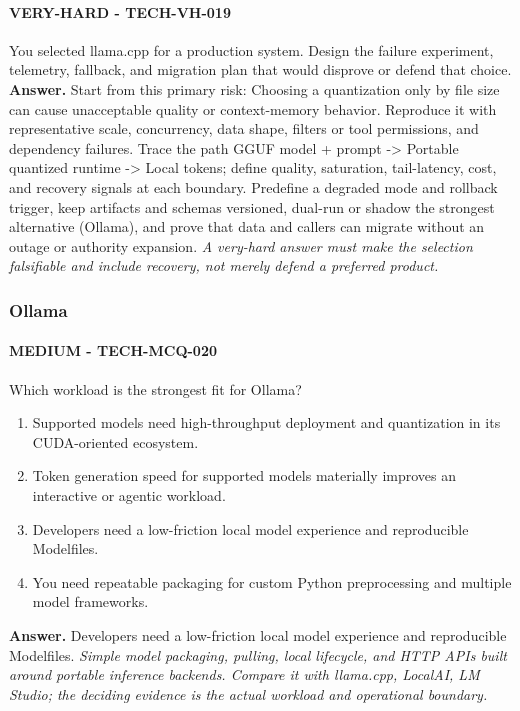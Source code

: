 \paragraph{VERY-HARD - TECH-VH-019} You selected llama.cpp for a production system. Design the failure experiment, telemetry, fallback, and migration plan that would disprove or defend that choice.
\textbf{Answer.} Start from this primary risk: Choosing a quantization only by file size can cause unacceptable quality or context-memory behavior. Reproduce it with representative scale, concurrency, data shape, filters or tool permissions, and dependency failures. Trace the path GGUF model + prompt -> Portable quantized runtime -> Local tokens; define quality, saturation, tail-latency, cost, and recovery signals at each boundary. Predefine a degraded mode and rollback trigger, keep artifacts and schemas versioned, dual-run or shadow the strongest alternative (Ollama), and prove that data and callers can migrate without an outage or authority expansion.
\textit{A very-hard answer must make the selection falsifiable and include recovery, not merely defend a preferred product.}
\subsubsection*{Ollama}
\paragraph{MEDIUM - TECH-MCQ-020} Which workload is the strongest fit for Ollama?
\begin{enumerate}[label=\Alph*.]
\item Supported models need high-throughput deployment and quantization in its CUDA-oriented ecosystem.
\item Token generation speed for supported models materially improves an interactive or agentic workload.
\item Developers need a low-friction local model experience and reproducible Modelfiles.
\item You need repeatable packaging for custom Python preprocessing and multiple model frameworks.
\end{enumerate}
\textbf{Answer.} Developers need a low-friction local model experience and reproducible Modelfiles.
\textit{Simple model packaging, pulling, local lifecycle, and HTTP APIs built around portable inference backends. Compare it with llama.cpp, LocalAI, LM Studio; the deciding evidence is the actual workload and operational boundary.}
